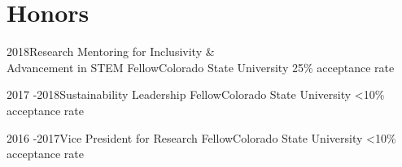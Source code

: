 \documentclass[letterpaper]{twentysecondcv} %
\begin{document}

\section{Honors}

\begin{twenty} %


\twentyitem
    	{2018}{}{Research Mentoring for Inclusivity \& \\Advancement in STEM Fellow}{Colorado State University}
        {25\% acceptance rate \vspace{1mm} }
        { {} }  

\twentyitem
    	{2017 -}{2018}{Sustainability Leadership Fellow}{Colorado State University}
        {<10\% acceptance rate \vspace{1mm} }
        { {} } 

\twentyitem
    	{2016 -}{2017}{Vice President for Research Fellow}{Colorado State University}
        {<10\% acceptance rate}
        { {} }  
        
        
\end{twenty}



\end{document}
